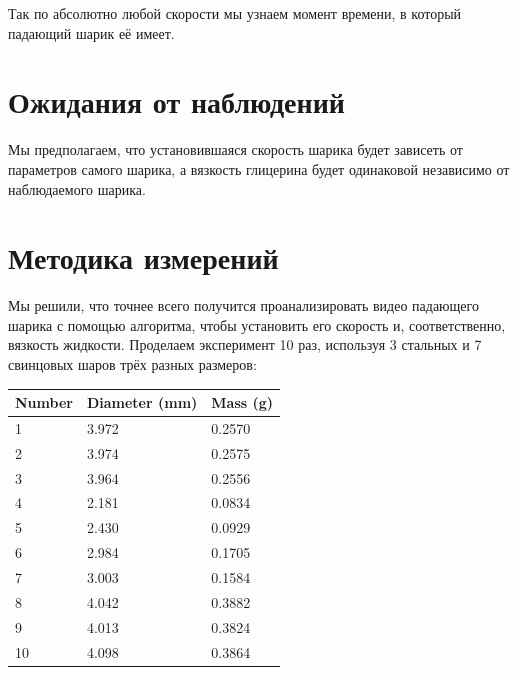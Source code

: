 \documentclass[a4paper, 12pt]{article}
\begin{document}
    Так по абсолютно любой скорости мы узнаем момент времени, в который падающий шарик её имеет.

    \section{Ожидания от наблюдений}

    Мы предполагаем, что установившаяся скорость шарика будет зависеть от параметров самого шарика,
    а вязкость глицерина будет одинаковой независимо от наблюдаемого шарика.


    \section{Методика измерений}

    Мы решили, что точнее всего получится проанализировать видео падающего шарика с помощью алгоритма,
    чтобы установить его скорость и, соответственно, вязкость жидкости.
    Проделаем эксперимент 10 раз, используя 3 стальных и 7 свинцовых шаров трёх разных размеров:

    \vspace{1.5em}
    \begin{tabular}{l l l}
        \bfseries Number & \bfseries Diameter (mm) & \bfseries Mass (g) \\ \hline
        1                & 3.972                   & 0.2570             \\ \hline
        2                & 3.974                   & 0.2575             \\ \hline
        3                & 3.964                   & 0.2556             \\ \hline
        4                & 2.181                   & 0.0834             \\ \hline
        5                & 2.430                   & 0.0929             \\ \hline
        6                & 2.984                   & 0.1705             \\ \hline
        7                & 3.003                   & 0.1584             \\ \hline
        8                & 4.042                   & 0.3882             \\ \hline
        9                & 4.013                   & 0.3824             \\ \hline
        10               & 4.098                   & 0.3864             \\ \hline
    \end{tabular}
    \vspace{1.5em}
\end{document}
